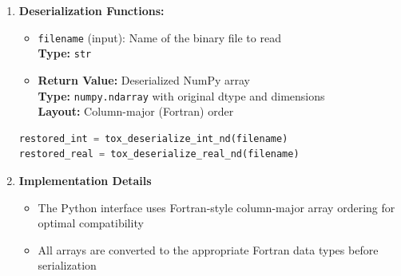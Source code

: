 \begin{enumerate}
\begin{enumerate}
\begin{itemize}
                    \item \texttt{filename} (input): Name of the binary file to create \\
                          \textbf{Type:} \texttt{str}
                  \end{itemize}
                  \begin{lstlisting}[language=Python, caption={Example usage of serialization function}]
tox_serialize_int_nd(int_array, filename)
tox_serialize_real_nd(real_array, filename)
                  \end{lstlisting}
                  
            \item \textbf{Deserialization Functions:}
                  \begin{itemize}
                    \item \texttt{filename} (input): Name of the binary file to read \\ \textbf{Type:}
                          \texttt{str}
                          
                    \item \textbf{Return Value:} Deserialized NumPy array \\ \textbf{Type:}
                          \texttt{numpy.ndarray} with original dtype and dimensions \\
                          \textbf{Layout:} Column-major (Fortran) order
                  \end{itemize}
                  
                  \begin{lstlisting}[language=Python, caption={Example usage of deserialization function}]
restored_int = tox_deserialize_int_nd(filename)
restored_real = tox_deserialize_real_nd(filename)
                  \end{lstlisting}
                  
            \item \textbf{Implementation Details}
                  
                  \begin{itemize}
                    \item The Python interface uses Fortran-style column-major array ordering
                          for optimal compatibility
                          
                    \item All arrays are converted to the appropriate Fortran data types
                          before serialization
                          

\end{itemize}
\end{enumerate}
\end{enumerate}
